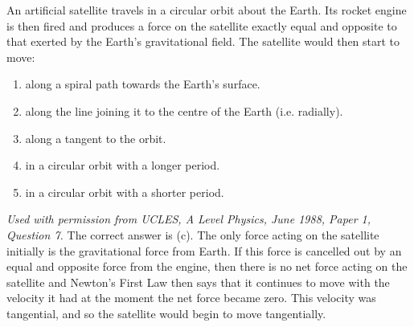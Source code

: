\begin{problem}[A1988PIQ7l] 
{An artificial satellite travels in a circular orbit about the Earth. Its rocket engine is then fired and produces a force on the satellite exactly equal and opposite to that exerted by the Earth's gravitational field. The satellite would then start to move:
\begin{enumerate}
	\item along a spiral path towards the Earth's surface.
	\item along the line joining it to the centre of the Earth (i.e. radially).
	\item along a tangent to the orbit. \answer
	\item in a circular orbit with a longer period.
	\item in a circular orbit with a shorter period.
\end{enumerate}}
{\textit{Used with permission from UCLES, A Level Physics, June 1988, Paper 1, Question 7.}}
{The correct answer is (c). The only force acting on the satellite initially is the gravitational force from Earth. If this force is cancelled out by an equal and opposite force from the engine, then there is no net force acting on the satellite and Newton's First Law then says that it continues to move with the velocity it had at the moment the net force became zero. This velocity was tangential, and so the satellite would begin to move tangentially.}
\end{problem}
